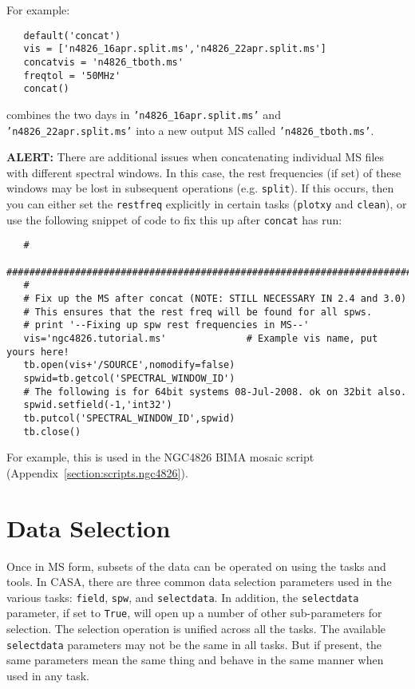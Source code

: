 For example:
\small
\begin{verbatim}
   default('concat')
   vis = ['n4826_16apr.split.ms','n4826_22apr.split.ms']
   concatvis = 'n4826_tboth.ms'
   freqtol = '50MHz'
   concat()
\end{verbatim}
\normalsize
combines the two days in {\tt 'n4826\_16apr.split.ms'} and
{\tt 'n4826\_22apr.split.ms'} into a new output MS called
{\tt 'n4826\_tboth.ms'}.

{\bf ALERT:} There are additional issues when concatenating
individual MS files with different spectral windows.  In this
case, the rest frequencies (if set) of these windows may be lost
in subsequent operations (e.g. {\tt split}).  If this occurs,
then you can either set the {\tt restfreq} explicitly in certain
tasks ({\tt plotxy} and {\tt clean}), or use the following snippet
of code to fix this up after {\tt concat} has run:
\small
\begin{verbatim}
   #
   ##########################################################################
   #
   # Fix up the MS after concat (NOTE: STILL NECESSARY IN 2.4 and 3.0)
   # This ensures that the rest freq will be found for all spws. 
   # print '--Fixing up spw rest frequencies in MS--'
   vis='ngc4826.tutorial.ms'              # Example vis name, put yours here!
   tb.open(vis+'/SOURCE',nomodify=false)
   spwid=tb.getcol('SPECTRAL_WINDOW_ID')
   # The following is for 64bit systems 08-Jul-2008. ok on 32bit also.
   spwid.setfield(-1,'int32')
   tb.putcol('SPECTRAL_WINDOW_ID',spwid)
   tb.close()
\end{verbatim}
\normalsize
For example, this is used in the NGC4826 BIMA mosaic script
(Appendix~\ref{section:scripts.ngc4826}).

\section{Data Selection}
\label{section:io.selection}

Once in MS form, subsets of the data can be operated on using the tasks and
tools.  In CASA, there are three common data selection parameters used in
the various
tasks: {\tt field}, {\tt spw}, and {\tt selectdata}.  In addition, the
{\tt selectdata} parameter, if set to {\tt True}, will open up a
number of other sub-parameters 
for selection.  The selection operation is unified across all the tasks.  The
available {\tt selectdata} parameters may not be the same in all tasks.  But if
present, the same parameters mean the same thing and behave in the
same manner when used in any task.

